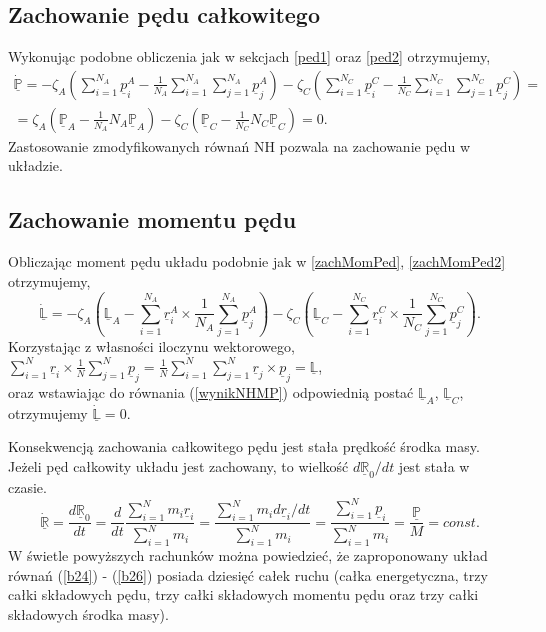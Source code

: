\documentclass[12pt,a4paper,openright]{report} %
\begin{document}
\subsection{Zachowanie pędu całkowitego}
Wykonując podobne obliczenia jak w sekcjach \ref{ped1} oraz \ref{ped2} otrzymujemy,
\begin{equation}
\begin{gathered}
\underline{\dot{\mathbb{P}}}=-\zeta_A \left( \sum_{i=1}^{N_A} \underline{p}^A_i - \frac{1}{N_A} \sum_{i=1}^{N_A} \sum_{j=1}^{N_A} \underline{p}^A_j \right) -\zeta_C \left( \sum_{i=1}^{N_C} \underline{p}^C_i - \frac{1}{N_C} \sum_{i=1}^{N_C} \sum_{j=1}^{N_C} \underline{p}^C_j \right)=\\
=\zeta_A \left( \underline{\mathbb{P}}_A - \frac{1}{N_A} N_A \underline{\mathbb{P}}_A \right) - \zeta_C \left( \underline{\mathbb{P}}_C - \frac{1}{N_C} N_C \underline{\mathbb{P}}_C \right) = 0.
\end{gathered}
\end{equation}
Zastosowanie zmodyfikowanych równań NH pozwala na zachowanie pędu w układzie.
\subsection{Zachowanie momentu pędu}
%
Obliczając moment pędu układu podobnie jak w \ref{zachMomPed}, \ref{zachMomPed2} otrzymujemy,
%
\begin{equation}
\underline{\mathbb{\dot{L}}}=-\zeta_{A} \left( \underline{\mathbb{L}}_A - \sum_{i=1}^{N_A} \underline{r}^A_i \times \frac{1}{N_A} \sum_{j=1}^{N_A} \underline{p}^A_j \right) -\zeta_{C} \left( \underline{\mathbb{L}}_C - \sum_{i=1}^{N_C} \underline{r}^C_i \times \frac{1}{N_C} \sum_{j=1}^{N_C} \underline{p}^C_j \right).
\label{wynikNHMP}
\end{equation}
%
Korzystając z własności iloczynu wektorowego, \\ $\sum_{i=1}^{N} \underline{r}_i \times \frac{1}{N} \sum_{j=1}^{N} \underline{p}_j = \frac{1}{N} \sum_{i=1}^{N} \sum_{j=1}^{N} \underline{r}_j \times \underline{p}_j = \underline{\mathbb{L}}$,\\ oraz wstawiając do równania (\ref{wynikNHMP}) odpowiednią postać $\underline{\mathbb{L}}_A$, $\underline{\mathbb{L}}_C$, otrzymujemy $\underline{\mathbb{\dot{L}}}=0$.

Konsekwencją zachowania całkowitego pędu jest stała prędkość środka masy. Jeżeli pęd całkowity układu jest zachowany, to wielkość ${d \underline{\mathbb{R}}_0}/{dt}$ jest stała w czasie.
\begin{equation}
\underline{\mathbb{\dot{R}}}=\frac{d \underline{\mathbb{R}}_0}{dt}=\frac{d}{dt} \frac{\sum_{i=1}^{N} m_i \underline{r}_i }{\sum_{i=1}^{N} m_i}=\frac{\sum_{i=1}^{N}
m_i {d \underline{r}_i}/{dt} }{\sum_{i=1}^{N} m_i}=\frac{\sum_{i=1}^{N} \underline{p}_i }{\sum_{i=1}^{N} m_i}=\frac{\underline{\mathbb{P}}}{M} = const.
\label{ZachSrodkaM-ZT2}
\end{equation} 
W świetle powyższych rachunków można powiedzieć, że zaproponowany układ równań (\ref{b24}) - (\ref{b26}) posiada dziesięć całek ruchu (całka energetyczna, trzy całki składowych pędu, trzy całki składowych momentu pędu oraz trzy całki składowych środka masy).
\end{document}
